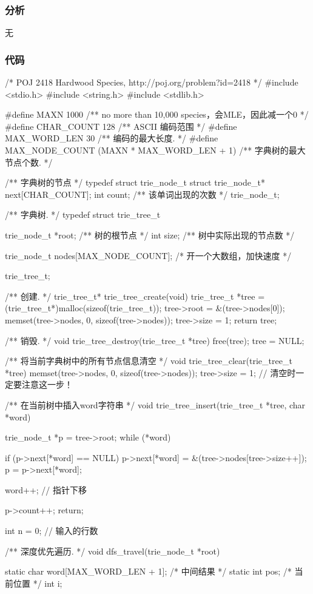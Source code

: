 \subsubsection{分析}
无


\subsubsection{代码}
\begin{Codex}[label=hardwood_species.c]
/* POJ 2418 Hardwood Species, http://poj.org/problem?id=2418 */
#include <stdio.h>
#include <string.h>
#include <stdlib.h>


#define MAXN 1000   /**  no more than 10,000 species，会MLE，因此减一个0 */
#define CHAR_COUNT  128 /** ASCII 编码范围 */
#define MAX_WORD_LEN 30 /** 编码的最大长度. */
#define MAX_NODE_COUNT  (MAXN * MAX_WORD_LEN + 1)  /** 字典树的最大节点个数. */


/** 字典树的节点 */
typedef struct trie_node_t {
    struct trie_node_t* next[CHAR_COUNT];
    int count;  /** 该单词出现的次数 */
} trie_node_t;

/** 字典树. */
typedef struct trie_tree_t {
    trie_node_t *root; /** 树的根节点 */
    int size; /** 树中实际出现的节点数 */

    trie_node_t nodes[MAX_NODE_COUNT]; /* 开一个大数组，加快速度 */
} trie_tree_t;

/** 创建. */
trie_tree_t* trie_tree_create(void) {
    trie_tree_t *tree = (trie_tree_t*)malloc(sizeof(trie_tree_t));
    tree->root = &(tree->nodes[0]);
    memset(tree->nodes, 0, sizeof(tree->nodes));
    tree->size = 1;
    return tree;
}

/** 销毁. */
void trie_tree_destroy(trie_tree_t *tree) {
    free(tree);
    tree = NULL;
}

/** 将当前字典树中的所有节点信息清空 */
void trie_tree_clear(trie_tree_t *tree) {
    memset(tree->nodes, 0, sizeof(tree->nodes));
    tree->size = 1; // 清空时一定要注意这一步！
}

/** 在当前树中插入word字符串 */
void trie_tree_insert(trie_tree_t *tree, char *word) {
    trie_node_t *p = tree->root;
    while (*word) {
        if (p->next[*word] == NULL) {
            p->next[*word] = &(tree->nodes[tree->size++]);
        }
        p = p->next[*word];

        word++; // 指针下移
    }
    p->count++;
    return;
}


int n = 0;  // 输入的行数

/** 深度优先遍历. */
void dfs_travel(trie_node_t *root) {
    static char word[MAX_WORD_LEN + 1]; /* 中间结果 */
    static int pos;  /* 当前位置 */
    int i;

}
\end{Codex}
